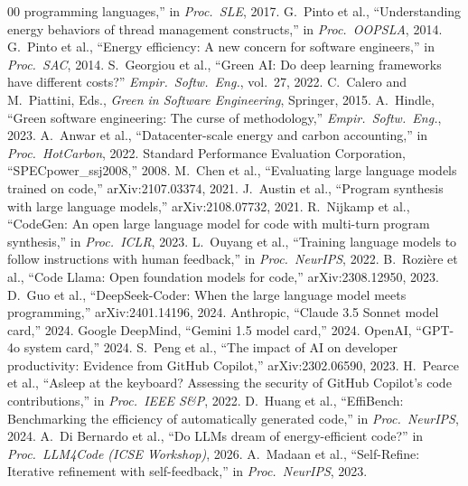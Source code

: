 \documentclass[journal]{IEEEtran}
\begin{document}
\begin{thebibliography}{00}
programming languages,'' in \emph{Proc.\ SLE}, 2017.
 G.~Pinto et al., ``Understanding energy behaviors of
thread management constructs,'' in \emph{Proc.\ OOPSLA}, 2014.
 G.~Pinto et al., ``Energy efficiency: A new concern for
software engineers,'' in \emph{Proc.\ SAC}, 2014.
 S.~Georgiou et al., ``Green AI: Do deep learning
frameworks have different costs?'' \emph{Empir.\ Softw.\ Eng.}, vol.~27,
2022.
 C.~Calero and M.~Piattini, Eds., \emph{Green in Software
Engineering}, Springer, 2015.
 A.~Hindle, ``Green software engineering: The curse of
methodology,'' \emph{Empir.\ Softw.\ Eng.}, 2023.
 A.~Anwar et al., ``Datacenter-scale energy and carbon
accounting,'' in \emph{Proc.\ HotCarbon}, 2022.
 Standard Performance Evaluation Corporation,
``SPECpower\_ssj2008,'' 2008.
 M.~Chen et al., ``Evaluating large language models trained
on code,'' arXiv:2107.03374, 2021.
 J.~Austin et al., ``Program synthesis with large language
models,'' arXiv:2108.07732, 2021.
 R.~Nijkamp et al., ``CodeGen: An open large language
model for code with multi-turn program synthesis,'' in \emph{Proc.\ ICLR},
2023.
 L.~Ouyang et al., ``Training language models to follow
instructions with human feedback,'' in \emph{Proc.\ NeurIPS}, 2022.
 B.~Rozi\`ere et al., ``Code Llama: Open foundation
models for code,'' arXiv:2308.12950, 2023.
 D.~Guo et al., ``DeepSeek-Coder: When the large
language model meets programming,'' arXiv:2401.14196, 2024.
 Anthropic, ``Claude 3.5 Sonnet model card,'' 2024.
 Google DeepMind, ``Gemini 1.5 model card,'' 2024.
 OpenAI, ``GPT-4o system card,'' 2024.
 S.~Peng et al., ``The impact of AI on developer
productivity: Evidence from GitHub Copilot,'' arXiv:2302.06590, 2023.
 H.~Pearce et al., ``Asleep at the keyboard? Assessing the
security of GitHub Copilot's code contributions,'' in \emph{Proc.\ IEEE
S\&P}, 2022.
 D.~Huang et al., ``EffiBench: Benchmarking the efficiency
of automatically generated code,'' in \emph{Proc.\ NeurIPS}, 2024.
 A.~Di Bernardo et al., ``Do LLMs dream of
energy-efficient code?'' in \emph{Proc.\ LLM4Code (ICSE Workshop)}, 2026.
 A.~Madaan et al., ``Self-Refine: Iterative refinement
with self-feedback,'' in \emph{Proc.\ NeurIPS}, 2023.

\end{thebibliography}
\end{document}
